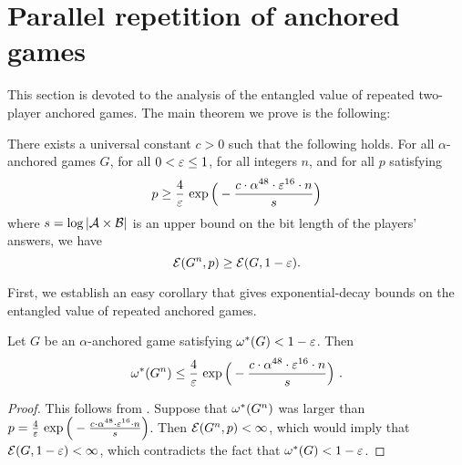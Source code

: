 
\section{Parallel repetition of anchored games}
\label{sec:analysis}

This section is devoted to the analysis of the entangled value of repeated two-player anchored games. The main theorem we prove is the following:


\begin{theorem}\label{thm:anchorpr_quantum}
	There exists a universal constant $c > 0$ such that the following holds. For all $\alpha$-anchored games $G$, for all $0 < \varepsilon \leq 1$, %
for all integers $n$, and for all $p$ satisfying
\begin{equation}
\label{eq:p}
p \geq \frac{4}{\varepsilon} \, \exp \Big ( - \frac{c \cdot \alpha^{48} \cdot \varepsilon^{16} \cdot n}{s} \Big)
\end{equation}
where  $s = \log |\mathcal{A} \times \mathcal{B}|$ is an upper bound on the bit length of the players' answers, we have
\[
	\mathcal{E}(G^n,p) \geq \mathcal{E}(G,1 - \varepsilon).
\]
\end{theorem}

First, we establish an easy corollary that gives exponential-decay bounds on the entangled value of repeated anchored games.

\begin{corollary}
Let $G$ be an $\alpha$-anchored game satisfying $\omega^*(G) < 1-\varepsilon$. Then
	$$ \omega^*(G^n)\leq \frac{4}{\varepsilon} \, \exp \Big ( - \frac{c \cdot \alpha^{48} \cdot \varepsilon^{16} \cdot n}{s} \Big)~.$$
\end{corollary}
\begin{proof}
	This follows from . Suppose that $\omega^*(G^n)$ was larger than $p = \frac{4}{\varepsilon} \, \exp \Big ( - \frac{c \cdot \alpha^{48} \cdot \varepsilon^{16} \cdot n}{s} \Big)$. Then $\mathcal{E}(G^n,p) < \infty$, which would imply that $\mathcal{E}(G,1 - \varepsilon) < \infty$, which contradicts the fact that $\omega^*(G) < 1 - \varepsilon$.
\end{proof}

